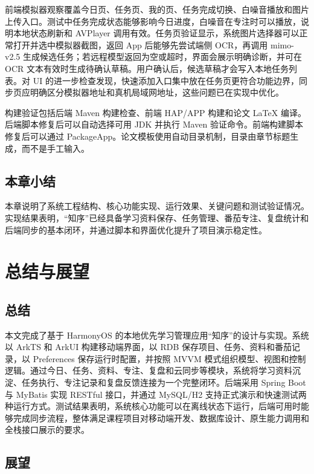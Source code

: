 前端模拟器观察覆盖今日页、任务页、我的页、任务完成切换、白噪音播放和图片上传入口。测试中任务完成状态能够影响今日进度，白噪音在专注时可以播放，说明本地状态刷新和 AVPlayer 调用有效。任务页验证显示，系统图片选择器可以正常打开并选中模拟器截图，返回 App 后能够先尝试端侧 OCR，再调用 mimo-v2.5 生成候选任务；若远程模型返回为空或超时，界面会展示明确诊断，并可在 OCR 文本有效时生成待确认草稿。用户确认后，候选草稿才会写入本地任务列表。对 UI 的进一步检查发现，快速添加入口集中放在任务页更符合功能边界，同步页应明确区分模拟器地址和真机局域网地址，这些问题已在实现中优化。

构建验证包括后端 Maven 构建检查、前端 HAP/APP 构建和论文 LaTeX 编译。后端脚本修复后可以自动选择可用 JDK 并执行 Maven 验证命令。前端构建脚本修复后可以通过 PackageApp。论文模板使用自动目录机制，目录由章节标题生成，而不是手工输入。

\section{本章小结}

本章说明了系统工程结构、核心功能实现、运行效果、关键问题和测试验证情况。实现结果表明，“知序”已经具备学习资料保存、任务管理、番茄专注、复盘统计和后端同步的基本闭环，并通过脚本和界面优化提升了项目演示稳定性。

\chapter{总结与展望}

\section{总结}

本文完成了基于 HarmonyOS 的本地优先学习管理应用“知序”的设计与实现。系统以 ArkTS 和 ArkUI 构建移动端界面，以 RDB 保存项目、任务、资料和番茄记录，以 Preferences 保存运行时配置，并按照 MVVM 模式组织模型、视图和控制逻辑。通过今日、任务、资料、专注、复盘和云同步等模块，系统将学习资料沉淀、任务执行、专注记录和复盘反馈连接为一个完整闭环。后端采用 Spring Boot 与 MyBatis 实现 RESTful 接口，并通过 MySQL/H2 支持正式演示和快速测试两种运行方式。测试结果表明，系统核心功能可以在离线状态下运行，后端可用时能够完成同步流程，整体满足课程项目对移动端开发、数据库设计、原生能力调用和全栈接口展示的要求。

\section{展望}

